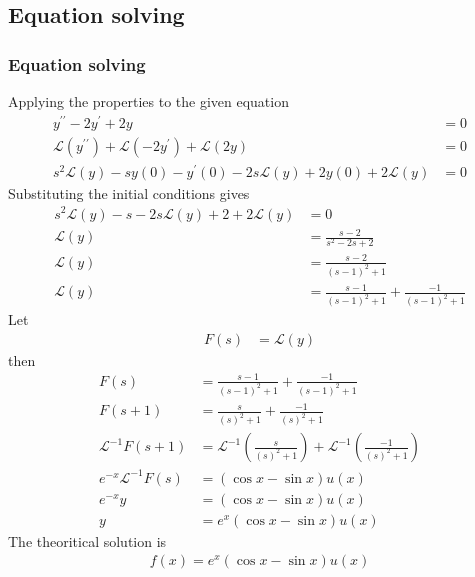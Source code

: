 \documentclass{beamer}
\providecommand{\brak}[1]{\ensuremath{\left(#1\right)}}
\theoremstyle{remark}
\numberwithin{equation}{section}
\begin{document}
\subsection{Equation solving}
\begin{frame}
\frametitle{Equation solving}
Applying the properties to the given equation
\begin{align}
	y^{\prime\prime} -2y^{\prime} +2y &= 0\\
	\mathcal{L}\brak{y^{\prime\prime}} + \mathcal{L}\brak{-2y^\prime}+\mathcal{L}\brak{2y} &= 0\\
	s^2\mathcal{L}\brak{y} -sy\brak{0}-y^\prime\brak{0}-2s\mathcal{L}\brak{y}+2y\brak{0}+2\mathcal{L}\brak{y} &= 0
\end{align}
Substituting the initial conditions gives
\begin{align}
	s^2\mathcal{L}\brak{y} -s-2s\mathcal{L}\brak{y}+2+2\mathcal{L}\brak{y} &= 0\\
	\mathcal{L}\brak{y} &= \frac{s-2}{s^2-2s+2}\\
	\mathcal{L}\brak{y} &= \frac{s-2}{\brak{s-1}^2+1}\\
	\mathcal{L}\brak{y} &= \frac{s-1}{\brak{s-1}^2+1} + \frac{-1}{\brak{s-1}^2+1}
\end{align}
Let
\begin{align}
	F\brak{s} &= \mathcal{L}\brak{y}
\end{align}
then
\begin{align}
	F\brak{s} &= \frac{s-1}{\brak{s-1}^2+1} + \frac{-1}{\brak{s-1}^2+1}\\
	F\brak{s+1} &= \frac{s}{\brak{s}^2+1} + \frac{-1}{\brak{s}^2+1}\\
	\mathcal{L}^{-1}F\brak{s+1} &= \mathcal{L}^{-1}\brak{\frac{s}{\brak{s}^2+1}} + \mathcal{L}^{-1}\brak{\frac{-1}{\brak{s}^2+1}}\\
	e^{-x}\mathcal{L}^{-1}F\brak{s} &= \brak{\cos{x} - \sin{x}}u\brak{x}\\
	e^{-x}y &= \brak{\cos{x} - \sin{x}}u\brak{x}\\
	y &= e^{x}\brak{\cos{x}-\sin{x}}u\brak{x}
\end{align}
The theoritical solution is 
\begin{align}
	f\brak{x} = e^{x}\brak{\cos{x}-\sin{x}}u\brak{x}
\end{align}
\end{frame}
\end{document}
